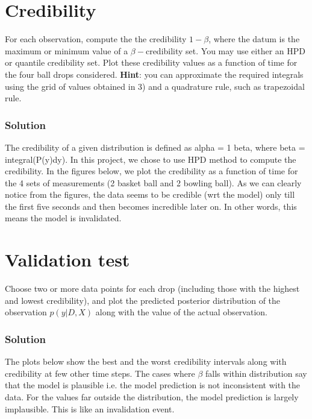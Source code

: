 \documentclass{article}
\begin{document}
\section{Credibility}

For each observation, compute the the credibility $1-\beta$, where
the datum is the maximum or minimum value of a $\beta-$credibility
set. You may use either an HPD or quantile credibility set. Plot these
credibility values as a function of time for the four ball drops considered.
\textbf{Hint}: you can approximate the required integrals using the
grid of values obtained in 3) and a quadrature rule, such as trapezoidal
rule.


\subsubsection*{Solution}

The credibility of a given distribution is defined as alpha = 1 \textendash{}
beta, where beta = integral(P(y)dy). In this project, we chose to
use HPD method to compute the credibility. In the figures below, we
plot the credibility as a function of time for the 4 sets of measurements
(2 basket ball and 2 bowling ball). As we can clearly notice from
the figures, the data seems to be credible (wrt the model) only till
the first five seconds and then becomes incredible later on. In other
words, this means the model is invalidated. 


\section{Validation test}

Choose two or more data points for each drop (including those with
the highest and lowest credibility), and plot the predicted posterior
distribution of the observation $p\left(y|D,X\right)$ along with
the value of the actual observation.


\subsubsection*{Solution}

The plots below show the best and the worst credibility intervals
along with credibility at few other time steps. The cases where $\beta$
falls within distribution say that the model is plausible \textendash{}
i.e. the model prediction is not inconsistent with the data. For the
values far outside the distribution, the model prediction is largely
implausible. This is like an invalidation event.
\end{document}
